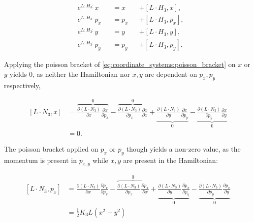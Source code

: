 \begin{equation}
    \begin{alignedat}{3}
        &e^{L:H_3:} x   &&= x   &&+ [L \cdot H_3, x], \\
        &e^{L:H_3:} p_x &&= p_x &&+ [L \cdot H_3, p_x], \\
        &e^{L:H_3:} y   &&= y   &&+ [L \cdot H_3, y], \\
        &e^{L:H_3:} p_y &&= p_y &&+ [L \cdot H_3, p_y].
        \label{eq:coordinate_systems:lie_exponential_first_order_sextupole}
    \end{alignedat}
\end{equation}

Applying the poisson bracket of \cref{eq:coordinate_systems:poisson_bracket} on $x$ or $y$ yields
$0$, as neither the Hamiltonian nor $x, y$ are dependent on $p_x, p_y$ respectively,

\begin{equation}
  \begin{aligned}
    [L \cdot N_3, x] &= 
       \overbrace{\frac{\partial (L \cdot N_3)}{\partial x} \frac{\partial x}{\partial p_x}}^{0}
       - \overbrace{\frac{\partial (L \cdot N_3)}{\partial p_x} \frac{\partial x}{\partial x}}^{0}
       + \underbrace{\frac{\partial (L \cdot N_3)}{\partial y} \frac{\partial x}{\partial p_y}}_0
       - \underbrace{\frac{\partial (L \cdot N_3)}{\partial p_y} \frac{\partial x}{\partial y}}_0 \\
                    &= 0.
  \end{aligned}
\end{equation}


The poisson bracket applied on $p_x$ or $p_y$ though yields a non-zero value, as the momentum is
present in $p_{x, y}$ while $x, y$ are present in the Hamiltonian:

\begin{equation}
  \begin{aligned}
    [L \cdot N_3, p_x] &=
       \frac{\partial (L \cdot N_3)}{\partial x} \frac{\partial p_x}{\partial p_x}
     - \overbrace{\frac{\partial (L \cdot N_3)}{\partial p_x} \frac{\partial p_x}{\partial x}}^{0}
     + \underbrace{\frac{\partial (L \cdot N_3)}{\partial y} \frac{\partial p_x}{\partial p_y}}_0
     - \underbrace{\frac{\partial (L \cdot N_3)}{\partial p_y} \frac{\partial p_x}{\partial y}}_0 \\
                        & = \frac{1}{2} K_3 L (x^2 - y^2)
  \end{aligned}
\end{equation}

